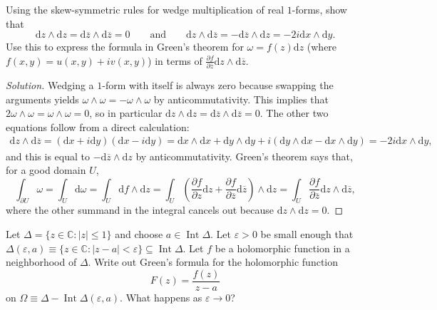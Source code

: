 \documentclass[10pt]{article}
\providecommand{\ol}{\overline}
\newcommand{\dd}{\mathrm{d}}
\providecommand{\eps}{\varepsilon}
\providecommand{\CC}{\mathbb C}
\newenvironment{soln}{\begin{proof}[Solution]}{\end{proof}}
\providecommand{\abs}[1]{\left\lvert #1\right\rvert}
\begin{document}
\begin{problem}
    Using the skew-symmetric rules for wedge multiplication
    of real $1$-forms, show that
    \begin{equation*}
        \dd z\wedge\dd z = \dd\ol z\wedge\dd\ol z = 0
	\qquad\text{and}\qquad
	\dd z\wedge\dd\ol z = -\dd\ol z\wedge\dd z
	= -2i\dd x\wedge\dd y.
    \end{equation*}
    Use this to express the formula in Green's theorem
    for $\omega = f(z)\dd z$
    (where $f(x,y) = u(x,y) + iv(x,y)$) in terms of
    $\frac{\partial f}{\partial\ol z}\dd z\wedge\dd\ol z$.
\end{problem}

\begin{soln}
    Wedging a $1$-form with itself is always zero because
    swapping the arguments yields
    $\omega\wedge\omega = -\omega\wedge\omega$
    by anticommutativity.
    This implies that $2\omega\wedge\omega = \omega\wedge\omega = 0$,
    so in particular $\dd z\wedge\dd z = \dd\ol z\wedge\dd\ol z = 0$.
    The other two equations follow from a direct calculation:
    \begin{gather*}
	\dd z\wedge\dd\ol z
	= (\dd x + i\dd y)(\dd x - i\dd y)
	= \dd x\wedge\dd x + \dd y\wedge\dd y
	+ i(\dd y\wedge\dd x - \dd x\wedge\dd y)
	= -2i\dd x\wedge\dd y,
    \end{gather*}
    and this is equal to $-\dd\ol z\wedge\dd z$ by anticommutativity.
    Green's theorem says that, for a good domain $U$,
    \begin{equation*}
	\int_{\partial U}\omega = \int_U\dd\omega
	= \int_U \dd f\wedge\dd z
	= \int_U \left(\frac{\partial f}{\partial z}\dd z
	+ \frac{\partial f}{\partial\ol z}\dd\ol z\right)\wedge\dd z
	= \int_U \frac{\partial f}{\partial\ol z}\dd z\wedge\dd\ol z,
    \end{equation*}
    where the other summand in the integral cancels out
    because $\dd z\wedge\dd z = 0$.
\end{soln}

\pagebreak
\begin{problem}
    Let $\Delta = \{z\in\CC : \abs z\le 1\}$
    and choose $a\in\operatorname{Int}\Delta$.
    Let $\eps>0$ be small enough that
    $\Delta(\eps,a) \equiv \{z\in\CC : \abs{z-a} < \eps\}\subseteq
    \operatorname{Int}\Delta$. Let $f$ be a holomorphic function
    in a neighborhood of $\Delta$. Write out Green's formula for
    the holomorphic function
    \begin{equation*}
	F(z) = \frac {f(z)}{z-a}
    \end{equation*}
    on $\Omega \equiv\Delta - \operatorname{Int}\Delta(\eps,a)$.
    What happens as $\eps\to 0$?
\end{problem}
\end{document}

